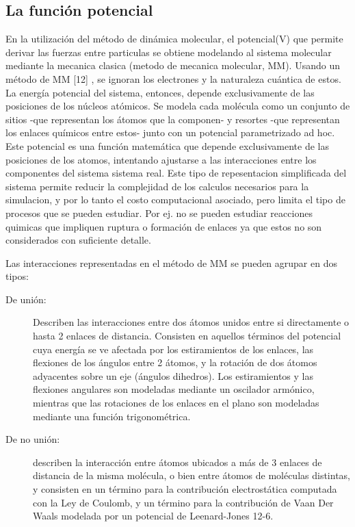 \documentclass[a4paper,10pt]{report}
\begin{document}
\subsection{La función potencial}


En la utilización del método de dinámica molecular, el potencial(V) que permite derivar las fuerzas entre particulas se obtiene modelando al sistema molecular mediante la mecanica clasica (metodo de mecanica molecular, MM).
Usando un método de MM [12] , se ignoran los electrones y la naturaleza cuántica de estos. La energía potencial del sistema, entonces, depende exclusivamente de las posiciones de los núcleos atómicos. Se modela cada molécula como un conjunto de sitios -que representan los átomos que la componen- y resortes -que representan los enlaces químicos entre estos- junto con un potencial parametrizado ad hoc.
Este potencial es una función matemática que depende exclusivamente de las posiciones de los atomos, intentando ajustarse a las interacciones entre los componentes del sistema sistema real. Este tipo de repesentacion simplificada del sistema permite reducir la complejidad de los calculos necesarios para la simulacion, y por lo tanto el costo computacional asociado, pero limita el tipo de procesos que se pueden estudiar. Por ej. no se pueden estudiar reacciones quimicas que impliquen ruptura o formación de enlaces ya que estos no son considerados con suficiente detalle.

Las interacciones representadas en el método de MM se pueden agrupar en dos tipos:

\begin{description}
 \item [De unión:] Describen las interacciones entre dos átomos unidos entre si directamente o hasta 2 enlaces de distancia. Consisten en aquellos términos del potencial cuya energía se ve afectada por los
estiramientos de los enlaces, las flexiones de los ángulos entre 2 átomos, y la rotación de dos átomos adyacentes sobre un eje (ángulos dihedros). Los estiramientos y las flexiones angulares son modeladas
mediante un oscilador armónico, mientras que las rotaciones de los enlaces en el plano son modeladas mediante una función trigonométrica.

\item [De no unión:] describen la interacción entre átomos ubicados a más de 3 enlaces de distancia de la
misma molécula, o bien entre átomos de moléculas distintas, y consisten en un término para la
contribución electrostática computada con la Ley de Coulomb, y un término para la contribución de
Vaan Der Waals modelada por un potencial de Leenard-Jones 12-6.


\end{description}
\end{document}
